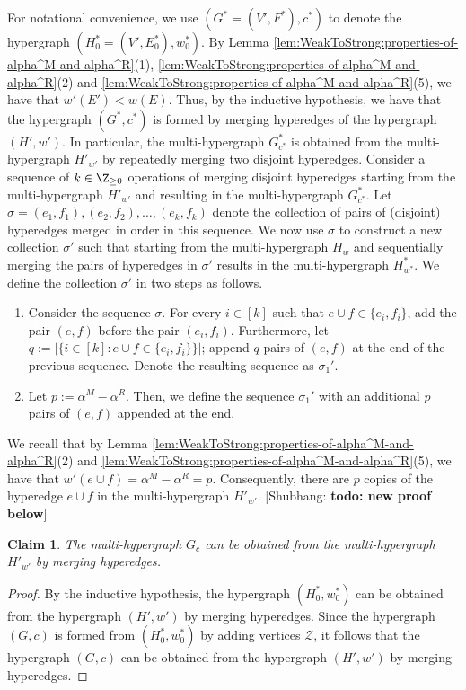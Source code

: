 \documentclass{article}
\newtheorem{claim}{Claim}[section]
\newcommand{\zeros}{\ensuremath{\mathcal{Z}}\xspace}
\newcommand{\shubhang}[1]{{\color{blue}[{\tiny Shubhang: \bf #1}]\marginpar{\color{blue}*}}}
\begin{document}
    \iffalse
    For notational convenience, we use  $(G^* = (V', F^*), c^*)$ to denote the  hypergraph $ (H_0^* = (V', E_0^*), w_0^*)$. By Lemma \ref{lem:WeakToStrong:properties-of-alpha^M-and-alpha^R}(1), \ref{lem:WeakToStrong:properties-of-alpha^M-and-alpha^R}(2) and \ref{lem:WeakToStrong:properties-of-alpha^M-and-alpha^R}(5), we have that $w'(E') < w(E)$. Thus, by the inductive hypothesis, we have that the hypergraph $(G^*, c^*)$ is formed by merging hyperedges of the hypergraph $(H', w')$. In particular, the multi-hypergraph $G^*_{c^*}$ is obtained from the multi-hypergraph $H'_{w'}$ by repeatedly merging two disjoint hyperedges. Consider a sequence of $k \in \Z_{\geq 0}$ operations of merging disjoint hyperedges starting from the multi-hypergraph $H'_{w'}$ and resulting in the multi-hypergraph $G^*_{c^*}$. Let $\sigma = (e_1, f_1), (e_2, f_2), \ldots, (e_k, f_k)$ denote the collection of pairs of (disjoint) hyperedges merged in order in this sequence. We now use $\sigma$ to construct a new collection $\sigma'$ such that starting from the multi-hypergraph $H_w$ and sequentially merging the pairs of hyperedges in $\sigma'$   results in the multi-hypergraph $H^*_{w^*}$. We define the collection $\sigma'$ in two steps as follows.
    \begin{enumerate}
        \item Consider the sequence $\sigma$. For every $i \in [k]$ such that $e\cup f \in \{e_i, f_i\}$, add the pair $(e, f)$ before the pair $(e_i, f_i)$. Furthermore, let $q := |\{i \in [k] : e\cup f \in \{e_i, f_i\}\}|$; append $q$ pairs of $(e, f)$ at the end of the previous sequence. Denote the resulting sequence as $\sigma_1'$.
        \item Let $p := \alpha^M - \alpha^R$. Then, we define the sequence $\sigma_1'$ with an additional $p$ pairs of $(e, f)$ appended at the end.
    \end{enumerate}
    
    We recall that by Lemma \ref{lem:WeakToStrong:properties-of-alpha^M-and-alpha^R}(2) and \ref{lem:WeakToStrong:properties-of-alpha^M-and-alpha^R}(5), we have that $w'(e\cup f) = \alpha^M - \alpha^R = p$. Consequently, there are $p$ copies of the hyperedge $e\cup f$ in the multi-hypergraph $H'_{w'}$. 
\shubhang{todo: new proof below}
    \begin{claim}
        The multi-hypergraph $G_c$ can be obtained from the multi-hypergraph $H'_{w'}$ by merging hyperedges.
    \end{claim}
    \begin{proof}
        By the inductive hypothesis, the hypergraph $(H^*_0, w^*_0)$ can be obtained from the hypergraph $(H', w')$ by merging hyperedges. Since the hypergraph $(G, c)$ is formed from $(H_0^*, w_0^*)$ by adding vertices $\zeros$, it follows that the hypergraph $(G, c)$ can be obtained from the hypergraph $(H', w')$ by merging hyperedges.            
    \end{proof}
\end{document}
